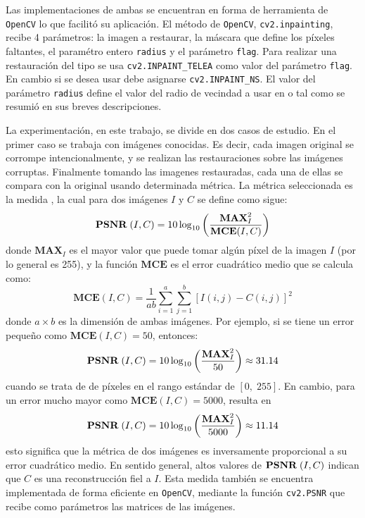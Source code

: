 Las implementaciones de ambas se encuentran en forma de herramienta de \texttt{OpenCV} lo que facilit\'o su aplicaci\'on. El m\'etodo de \texttt{OpenCV}, \texttt{cv2.inpainting}, recibe 4 par\'ametros: la imagen a restaurar, la m\'ascara que define los p\'ixeles faltantes, el param\'etro entero \texttt{radius} y el par\'ametro \texttt{flag}. Para realizar una restauraci\'on del tipo \TELEA se usa \texttt{cv2.INPAINT\_TELEA} como valor del par\'ametro \texttt{flag}. En cambio si se desea usar \NS debe asignarse \texttt{cv2.INPAINT\_NS}. El valor del par\'ametro \texttt{radius} define el valor del radio de vecindad a usar en \TELEA o \NS tal como se resumi\'o en sus breves descripciones.

La experimentaci\'on, en este trabajo, se divide en dos casos de estudio. En el primer caso se trabaja con im\'agenes conocidas. Es decir, cada imagen original se corrompe intencionalmente, y se realizan las restauraciones sobre las im\'agenes corruptas. Finalmente tomando las imagenes restauradas, cada una de ellas se compara con la original usando determinada m\'etrica. La m\'etrica seleccionada es la medida \PSNR \cite{enwiki:psnr}, la cual para dos im\'agenes $I$ y $C$ se define como sigue:
\begin{equation}
	\textbf{PSNR}\;(I, C) = 10 \log_{10} \left(\frac{\textbf{MAX}^2_I}{\textbf{MCE}(I, C)}\right)
\end{equation}
donde $\textbf{MAX}_I$ es el mayor valor que puede tomar alg\'un p\'ixel de la imagen $I$ (por lo general es 255), y la funci\'on $\textbf{MCE}$ es el error cuadr\'atico medio que se calcula como:
\begin{equation}
	\textbf{MCE}(I, C) = \frac{1}{ab}\sum_{i=1}^{a}\sum_{j=1}^{b}[I(i, j) - C(i, j)]^2
\end{equation}
donde $a \times b$ es la dimensi\'on de ambas im\'agenes. Por ejemplo, si se tiene un error pequeño como $\textbf{MCE}(I, C) = 50$, entonces: $$\textbf{PSNR}\;(I, C) = 10 \log_{10} \left(\frac{\textbf{MAX}^2_I}{50}\right) \approx 31.14$$ cuando se trata de de p\'ixeles en el rango est\'andar de $[0,\;255]$. En cambio, para un error mucho mayor como $\textbf{MCE}(I, C) = 5000$, resulta en $$\textbf{PSNR}\;(I, C) = 10 \log_{10} \left(\frac{\textbf{MAX}^2_I}{5000}\right) \approx 11.14$$ esto significa que la m\'etrica \PSNR de dos im\'agenes es inversamente proporcional a su error cuadr\'atico medio. En sentido general, altos valores de $\textbf{PSNR}\;(I, C)$ indican que $C$ es una reconstrucción fiel a $I$. Esta medida tambi\'en se encuentra implementada de forma eficiente en \texttt{OpenCV}, mediante la funci\'on \texttt{cv2.PSNR} que recibe como par\'ametros las matrices de las im\'agenes.

